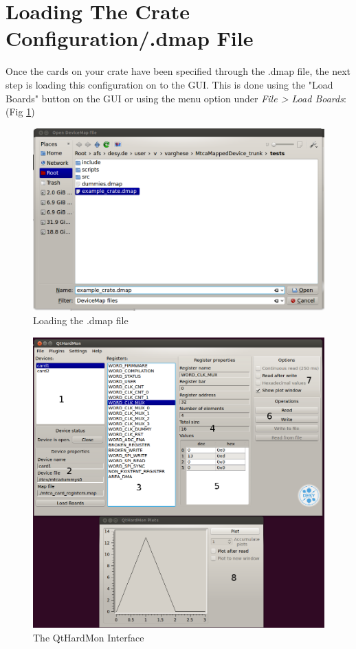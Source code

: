 \section{Loading The Crate Configuration/.dmap File}
Once the cards on your crate have been specified through the .dmap file, the next step is loading this configuration on to the GUI. This is done using the "Load Boards" button on the GUI or using the menu option under \textit{File > Load Boards}: (Fig \ref{load_boards_open_menu_to_load_dmap})

\begin{figure}[htbp]
\centering
\includegraphics[width=1\textwidth]{images/load_boards_2.png}
 \caption{Loading the .dmap file}
\label{load_boards_open_menu_to_load_dmap}
\end{figure}

\begin{figure}[htbp]
\centering
\includegraphics[width=1\textwidth]{images/explain_windows.png}
 \caption{The QtHardMon Interface}
\label{qthardmon_interface}
\end{figure}

